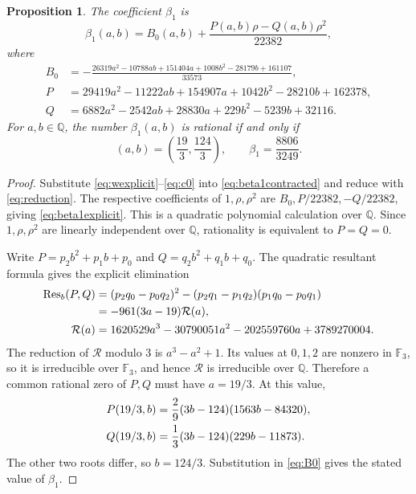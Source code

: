 \documentclass[11pt,reqno]{amsart}
\newcommand{\QQ}{\mathbb Q}
\newcommand{\Res}{\operatorname{Res}}
\newtheorem{proposition}[theorem]{Proposition}
\theoremstyle{remark}
\numberwithin{equation}{section}
\begin{document}
\begin{proposition}\label{prop:first}
The coefficient $\beta_1$ is
\begin{equation}\label{eq:beta1explicit}
 \beta_1(a,b)=B_0(a,b)
       +\frac{P(a,b)\rho-Q(a,b)\rho^2}{22382},
\end{equation}
where
\begin{align}
 B_0&=-\frac{
 26319a^2-10788ab+151404a+1008b^2-28179b+161107}{33573},
 \label{eq:B0}\\
 P&=29419a^2-11222ab+154907a+1042b^2-28210b+162378,
 \label{eq:P}\\
 Q&=6882a^2-2542ab+28830a+229b^2-5239b+32116.
 \label{eq:Q}
\end{align}
For $a,b\in\QQ$, the number $\beta_1(a,b)$ is rational if and only if
\begin{equation}\label{eq:unique}
 (a,b)=\left(\frac{19}{3},\frac{124}{3}\right),
 \qquad \beta_1=\frac{8806}{3249}.
\end{equation}
\end{proposition}
\begin{proof}
Substitute \eqref{eq:wexplicit}--\eqref{eq:c0} into
\eqref{eq:beta1contracted} and reduce with \eqref{eq:reduction}.
The respective coefficients of $1,\rho,\rho^2$ are
$B_0,P/22382,-Q/22382$, giving \eqref{eq:beta1explicit}.
This is a quadratic polynomial calculation over $\QQ$.
Since $1,\rho,\rho^2$ are linearly independent over $\QQ$,
rationality is equivalent to $P=Q=0$.

Write $P=p_2b^2+p_1b+p_0$ and $Q=q_2b^2+q_1b+q_0$.
The quadratic resultant formula gives the explicit elimination
\begin{align}
 \Res_b(P,Q)
 &=(p_2q_0-p_0q_2)^2
   -(p_2q_1-p_1q_2)(p_1q_0-p_0q_1)\notag\\
 &=-961(3a-19)\mathcal R(a),\label{eq:resultant}\\
 \mathcal R(a)
 &=1620529a^3-30790051a^2-202559760a+3789270004.
 \label{eq:eliminant}
\end{align}
The reduction of $\mathcal R$ modulo $3$ is $a^3-a^2+1$.
Its values at $0,1,2$ are nonzero in $\mathbb F_3$, so it is
irreducible over $\mathbb F_3$, and hence $\mathcal R$ is irreducible
over $\QQ$. Therefore a common rational zero of $P,Q$ must have
$a=19/3$. At this value,
\begin{align}
 P(19/3,b)&=\frac29(3b-124)(1563b-84320),\notag\\
 Q(19/3,b)&=\frac13(3b-124)(229b-11873).
 \label{eq:specialized}
\end{align}
The other two roots differ, so $b=124/3$. Substitution in
\eqref{eq:B0} gives the stated value of $\beta_1$.
\end{proof}
\end{document}
